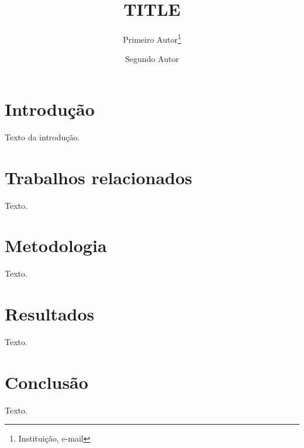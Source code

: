 \documentclass[a4paper,10pt,twocolumn]{article}
\title{{{TITLE}}}
\author{Primeiro Autor\thanks{Instituição, e-mail} \and Segundo Autor}
\date{}
\begin{document}

\section{Introdução}
Texto da introdução.

\section{Trabalhos relacionados}
Texto.

\section{Metodologia}
Texto.

\section{Resultados}
Texto.

\section{Conclusão}
Texto.



\end{document}
